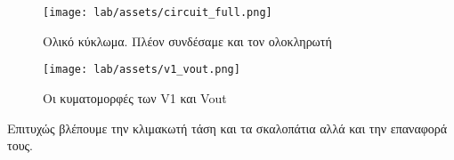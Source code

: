 \documentclass[12pt, a4paper]{article}
\begin{document}
\begin{figure}[h!]
    \centering
	\texttt{[image: lab/assets/circuit\_full.png]}
	\caption{Ολικό κύκλωμα. Πλέον συνδέσαμε και τον ολοκληρωτή}
\end{figure}


\begin{figure}[h!]
    \centering
	\texttt{[image: lab/assets/v1\_vout.png]}
	\caption{Οι κυματομορφές των V1 και Vout}
\end{figure}

Επιτυχώς βλέπουμε την κλιμακωτή τάση και τα σκαλοπάτια αλλά και την επαναφορά τους.
\end{document}
